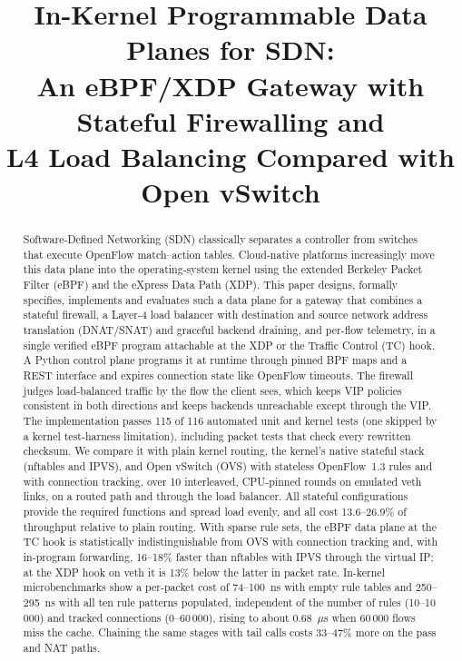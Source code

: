 \documentclass[conference]{IEEEtran}
\begin{document}
\title{In-Kernel Programmable Data Planes for SDN:\\
An eBPF/XDP Gateway with Stateful Firewalling and\\
L4 Load Balancing Compared with Open vSwitch}


\maketitle

\begin{abstract}
Software-Defined Networking (SDN) classically separates a controller from
switches that execute OpenFlow match--action tables. Cloud-native platforms
increasingly move this data plane into the operating-system kernel using the
extended Berkeley Packet Filter (eBPF) and the eXpress Data Path (XDP). This
paper designs, formally specifies, implements and evaluates such a data plane
for a gateway that combines a stateful firewall, a Layer-4 load balancer with
destination and source network address translation (DNAT/SNAT) and graceful
backend draining, and per-flow telemetry, in a single verified eBPF program
attachable at the XDP or the Traffic Control (TC) hook. A Python control plane
programs it at runtime through pinned BPF maps and a REST interface and
expires connection state like OpenFlow timeouts. The firewall judges
load-balanced traffic by the flow the client sees, which keeps VIP policies
consistent in both directions and keeps backends unreachable except through
the VIP. The implementation passes 115 of 116 automated unit and kernel tests
(one skipped by a kernel test-harness limitation), including packet tests
that check every rewritten checksum. We compare it with plain kernel routing,
the kernel's native stateful stack (nftables and IPVS), and Open vSwitch
(OVS) with stateless OpenFlow~1.3 rules and with connection tracking, over 10
interleaved, CPU-pinned rounds on emulated veth links, on a routed path and
through the load balancer. All stateful configurations provide the required
functions and spread load evenly, and all cost 13.6--26.9\% of throughput
relative to plain routing. With sparse rule sets, the eBPF data plane at the
TC hook is statistically indistinguishable from OVS with connection tracking
and, with in-program forwarding, 16--18\% faster than nftables with IPVS
through the virtual IP; at the XDP hook on veth it is 13\% below the latter
in packet rate. In-kernel microbenchmarks show a per-packet cost of 74--100~ns
with empty rule tables and 250--295~ns with all ten rule patterns populated,
independent of the number of rules (10--10\,000) and tracked connections
(0--60\,000), rising to about 0.68~$\mu$s when 60\,000 flows miss the cache.
Chaining the same stages with tail calls costs 33--47\% more on the pass
and NAT paths.
\end{abstract}
\end{document}

